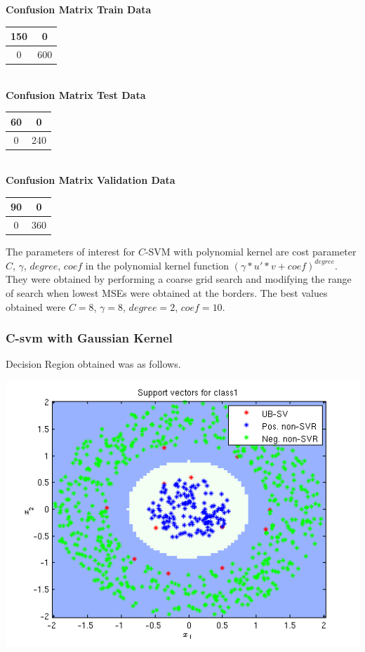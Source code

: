 \documentclass{article}
\begin{document}
\begin{flushleft}
\textbf{Confusion Matrix Train Data\\[5pt]}
\begin{tabular}{|c|c|}
\hline
150 & 0 \\
\hline
0 & 600\\
\hline
\end{tabular}
\textbf{\\[10pt] Confusion Matrix Test Data \\[5pt]}
\begin{tabular}{|c|c|}
\hline
60 & 0 \\
\hline
0 & 240\\
\hline
\end{tabular}
\textbf{\\[10pt] Confusion Matrix Validation Data \\[5pt]}
\begin{tabular}{|c|c|}
\hline
90 & 0 \\
\hline
0 & 360\\
\hline
\end{tabular}
\end{flushleft}

The parameters of interest for $C$-SVM with polynomial kernel are cost parameter $C$, $\gamma$, $degree$, $coef$ in the polynomial kernel function $(\gamma*u'*v+coef)^{degree}$. They were obtained by performing a coarse grid search and modifying the range of search when lowest MSEs were obtained at the borders.
The best values obtained were $C=8$, $\gamma=8$, $degree=2$, $coef=10$.


\subsubsection{C-svm with Gaussian Kernel}
Decision Region obtained was as follows.
\begin{center}
\includegraphics[scale=1]{Classification/1b/c_g/dec}
\end{center}
\end{document}
